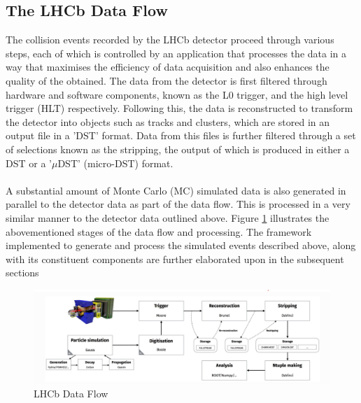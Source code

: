 \subsection{The LHCb Data Flow}\label{LHCbDataFlow}
The collision events recorded by the LHCb detector proceed through various steps, each of which is controlled by an application that processes the data in a way that maximises the efficiency of data acquisition and also enhances the quality of the obtained. The data from the detector is first filtered through hardware and software components, known as the L0 trigger, and the high level trigger (HLT) respectively. Following this, the data is
reconstructed to transform the detector into objects such as tracks and clusters, which are stored in an output file in a 'DST' format. Data from this files is further filtered through a set of selections known as the stripping, the output of which is produced in either a DST or a '$\mu$DST' (micro-DST) format.\\
\\
A substantial amount of Monte Carlo (MC) simulated data is also generated in parallel to the detector data as part of the data flow. This is processed in a very similar manner to the detector data outlined above. Figure \ref{LHCbData} illustrates the abovementioned stages of the data flow and processing. The framework implemented to generate and process the simulated events described above, along with its constituent components are further elaborated upon in the subsequent sections
\begin{figure}[H]
    \centering
    \includegraphics[scale = 0.4]{LHCbDataFlow.jpg}
    \caption{LHCb Data Flow}
    \label{LHCbData}
\end{figure}
